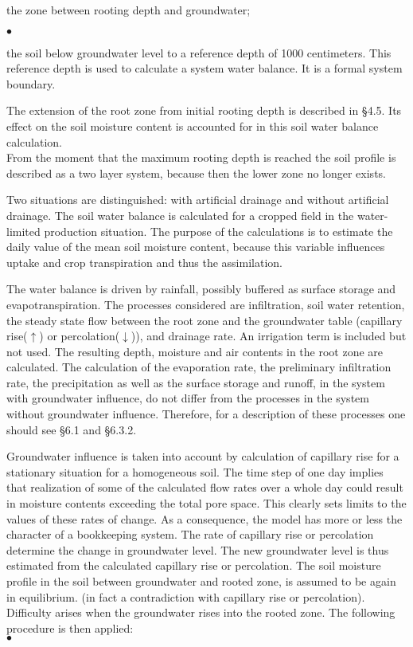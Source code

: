 \documentclass[11pt]{article}
\begin{document}
\begin{indenting}{1.27cm}
the zone between rooting depth and groundwater;
\end{indenting}
$\bullet$
\testlastline

\begin{indenting}{1.27cm}
the soil below groundwater level to a reference depth of 1000 centimeters. This
reference depth is used to calculate a system water balance. It is a formal system
boundary.
\end{indenting}
 
 \bigskip
The extension of the root zone from initial rooting depth is described in \S 4.5. Its effect
on the soil moisture content is accounted for in this soil water balance calculation.\\
From the moment that the maximum rooting depth is reached the soil profile is described
as a two layer system, because then the lower zone no longer exists.

Two situations are distinguished: with artificial drainage and without artificial drainage.
The soil water balance is calculated for a cropped field in the water-limited production
situation. The purpose of the calculations is to estimate the daily value of the mean soil
moisture content, because this variable influences uptake and crop transpiration and thus
the assimilation.

The water balance is driven by rainfall, possibly buffered as surface storage and
{\nobreak}evapotranspiration. The processes considered are infiltration, soil water retention, the
steady state flow between the root zone and the groundwater table (capillary rise($\uparrow$) or
percolation($\downarrow$)), and drainage rate. An irrigation term is included but not used. The
resulting depth, moisture and air contents in the root zone are calculated. The calculation
of the evaporation rate, the preliminary infiltration rate, the precipitation as well as the
surface storage and runoff, in the system with groundwater influence, do not differ from
the processes in the system without groundwater influence. Therefore, for a description of
these processes one should see \S 6.1 and \S 6.3.2.

Groundwater influence is taken into account by calculation of capillary rise for a
stationary situation for a homogeneous soil. The time step of one day implies that
realization of some of the calculated flow rates over a whole day could result in moisture
contents exceeding the total pore space. This clearly sets limits to the values of these rates
of change. As a consequence, the model has more or less the character of a bookkeeping
system. The rate of capillary rise or percolation determine the change in groundwater
level. The new groundwater level is thus estimated from the calculated capillary rise or
percolation. The soil moisture profile in the soil between groundwater and rooted zone, is
assumed to be again in equilibrium. (in fact a contradiction with capillary rise or
percolation). \\
Difficulty arises when the groundwater rises into the rooted zone. The following proce\-dure is then applied:\\
$\bullet$
\testlastline
\end{document}
